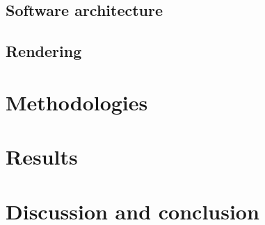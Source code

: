 \documentclass[%
    a4paper,
    nobib,   %
    openany  %
]{tufte-book}
\begin{document}
\section{Software architecture}
\label{sec:architecture}


\section{Rendering}
\label{sec:rendering}


\chapter{Methodologies}
\label{chap:methodologies}



\chapter{Results}
\label{chap:results}



\chapter{Discussion and conclusion}
\label{chap:discussion-conclusion}
\end{document}
